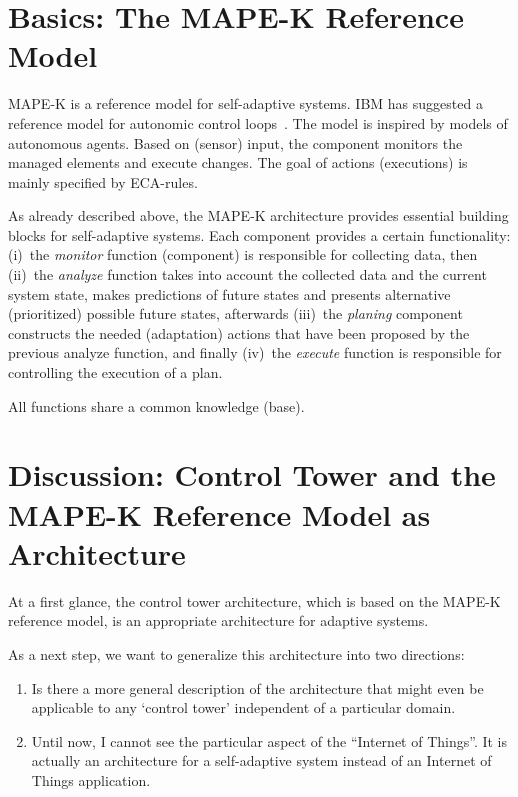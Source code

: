 \documentclass{llncs} %
\begin{document}
\section{Basics: The MAPE-K Reference Model}

MAPE-K is a reference model for self-adaptive systems. 
IBM has suggested a reference model for autonomic control loops~\cite{IBM2005}.
The model is inspired by models
of autonomous agents. Based on (sensor) input, the component monitors the managed elements
and execute changes. The goal of actions (executions) is mainly specified by ECA-rules.

As already described above, the MAPE-K architecture provides essential building blocks
for self-adaptive systems. Each component provides a certain functionality:
(i)~the \emph{monitor} function (component) is responsible for collecting data,
then (ii)~the \emph{analyze} function takes into account the collected data and the current
system state, makes predictions of future states and presents alternative (prioritized) possible
future states,
afterwards (iii)~the \emph{planing} component constructs the needed (adaptation) actions that have been
proposed by the previous analyze function, and finally
(iv)~the \emph{execute} function is responsible for controlling the execution of a plan.

All functions share a common knowledge (base). 


\section{Discussion: Control Tower and the MAPE-K Reference Model as Architecture}

At a first glance, the control tower architecture, which is based on the
MAPE-K reference model, is an appropriate architecture for adaptive systems.

As a next step, we want to generalize this architecture into two directions:
\begin{enumerate}
	\item Is there a more general description of the architecture that might even 
	be applicable to any `control tower' independent of a particular domain.
	 \item Until now, I cannot see the particular aspect of the ``Internet of Things''.
	 It is actually an architecture for a self-adaptive system instead of an Internet of Things application.
	
\end{enumerate}






\end{document}
